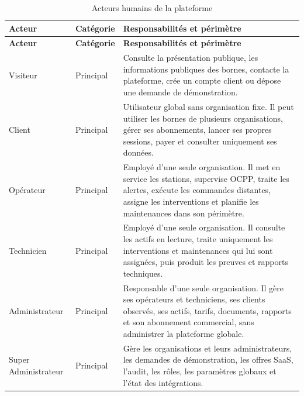 \begin{longtable}{|C{3.15cm}|C{2.15cm}|p{8.15cm}|}
  \caption{Acteurs humains de la plateforme}
  \label{tab:human-actors}\\
  \hline
  \textbf{Acteur} & \textbf{Catégorie} & \textbf{Responsabilités et périmètre}\\
  \hline
  \endfirsthead
  \hline
  \textbf{Acteur} & \textbf{Catégorie} & \textbf{Responsabilités et périmètre}\\
  \hline
  \endhead
  Visiteur & Principal &
  Consulte la présentation publique, les informations publiques des bornes, contacte
  la plateforme, crée un compte client ou dépose une demande de démonstration.\\\hline
  Client & Principal &
  Utilisateur global sans organisation fixe. Il peut utiliser les bornes de plusieurs
  organisations, gérer ses abonnements, lancer ses propres sessions, payer et
  consulter uniquement ses données.\\\hline
  Opérateur & Principal &
  Employé d'une seule organisation. Il met en service les stations, supervise OCPP,
  traite les alertes, exécute les commandes distantes, assigne les interventions et
  planifie les maintenances dans son périmètre.\\\hline
  Technicien & Principal &
  Employé d'une seule organisation. Il consulte les actifs en lecture, traite
  uniquement les interventions et maintenances qui lui sont assignées, puis produit
  les preuves et rapports techniques.\\\hline
  Administrateur & Principal &
  Responsable d'une seule organisation. Il gère ses opérateurs et techniciens, ses
  clients observés, ses actifs, tarifs, documents, rapports et son abonnement
  commercial, sans administrer la plateforme globale.\\\hline
  Super Administrateur & Principal &
  Gère les organisations et leurs administrateurs, les demandes de démonstration,
  les offres SaaS, l'audit, les rôles, les paramètres globaux et l'état des
  intégrations.\\
  \hline
\end{longtable}

